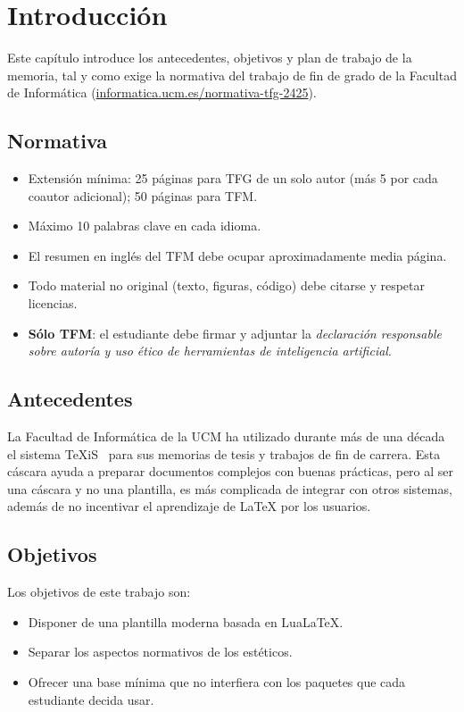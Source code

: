 \chapter{Introducción}

Este capítulo introduce los antecedentes, objetivos y plan de
trabajo de la memoria, tal y como exige la normativa del trabajo
de fin de grado de la Facultad de Informática
(\href{https://informatica.ucm.es/normativa-tfg-2425}{informatica.ucm.es/normativa-tfg-2425}).

\section{Normativa}

\begin{itemize}\setlength{\itemsep}{0pt}
  \item Extensión mínima: 25 páginas para TFG de un solo autor (más
        5 por cada coautor adicional); 50 páginas para TFM.
  \item Máximo 10 palabras clave en cada idioma.
  \item El resumen en inglés del TFM debe ocupar
        aproximadamente media página.
  \item Todo material no original (texto, figuras, código) debe
        citarse y respetar licencias.
  \item \textbf{Sólo TFM}: el estudiante debe firmar y adjuntar la
        \emph{declaración responsable sobre autoría y uso ético de
        herramientas de inteligencia artificial}.
\end{itemize}

\section{Antecedentes}

La Facultad de Informática de la UCM ha utilizado durante más de
una década el sistema TeXiS~\cite{texis} para sus memorias de
tesis y trabajos de fin de carrera. Esta cáscara ayuda a preparar
documentos complejos con buenas prácticas, pero al ser una
cáscara y no una plantilla, es más complicada de integrar con
otros sistemas, además de no incentivar el aprendizaje de LaTeX
por los usuarios.

\section{Objetivos}

Los objetivos de este trabajo son:
\begin{itemize}
  \item Disponer de una plantilla moderna basada en LuaLaTeX.
  \item Separar los aspectos normativos de los estéticos.
  \item Ofrecer una base mínima que no interfiera con los
        paquetes que cada estudiante decida usar.
\end{itemize}
